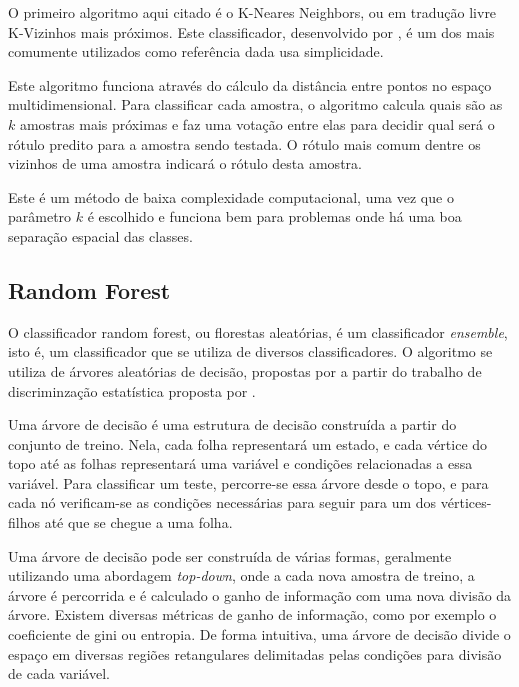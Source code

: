 O primeiro algoritmo aqui citado é o K-Neares Neighbors, ou em tradução livre K-Vizinhos mais próximos. Este classificador, desenvolvido por , é um dos mais comumente utilizados como referência dada usa simplicidade.

Este algoritmo funciona através do cálculo da distância entre pontos no espaço multidimensional. Para classificar cada amostra, o algoritmo calcula quais são as $k$ amostras mais próximas e faz uma votação entre elas para decidir qual será o rótulo predito para a amostra sendo testada. O rótulo mais comum dentre os vizinhos de uma amostra indicará o rótulo desta amostra.

Este é um método de baixa complexidade computacional, uma vez que o parâmetro $k$ é escolhido e funciona bem para problemas onde há uma boa separação espacial das classes.

\subsection{Random Forest}
\label{section:metodologia:classificadores:random-forest}

O classificador random forest, ou florestas aleatórias, é um classificador \textit{ensemble}, isto é, um classificador que se utiliza de diversos classificadores. O algoritmo se utiliza de árvores aleatórias de decisão, propostas por  a partir do trabalho de discriminzação estatística proposta por .

Uma árvore de decisão é uma estrutura de decisão construída a partir do conjunto de treino. Nela, cada folha representará um estado, e cada vértice do topo até as folhas representará uma variável e condições relacionadas a essa variável. Para classificar um teste, percorre-se essa árvore desde o topo, e para cada nó verificam-se as condições necessárias para seguir para um dos vértices-filhos até que se chegue a uma folha.

Uma árvore de decisão pode ser construída de várias formas, geralmente utilizando uma abordagem \textit{top-down}, onde a cada nova amostra de treino, a árvore é percorrida e é calculado o ganho de informação com uma nova divisão da árvore. Existem diversas métricas de ganho de informação, como por exemplo o coeficiente de gini ou entropia. De forma intuitiva, uma árvore de decisão divide o espaço em diversas regiões retangulares delimitadas pelas condições para divisão de cada variável.

